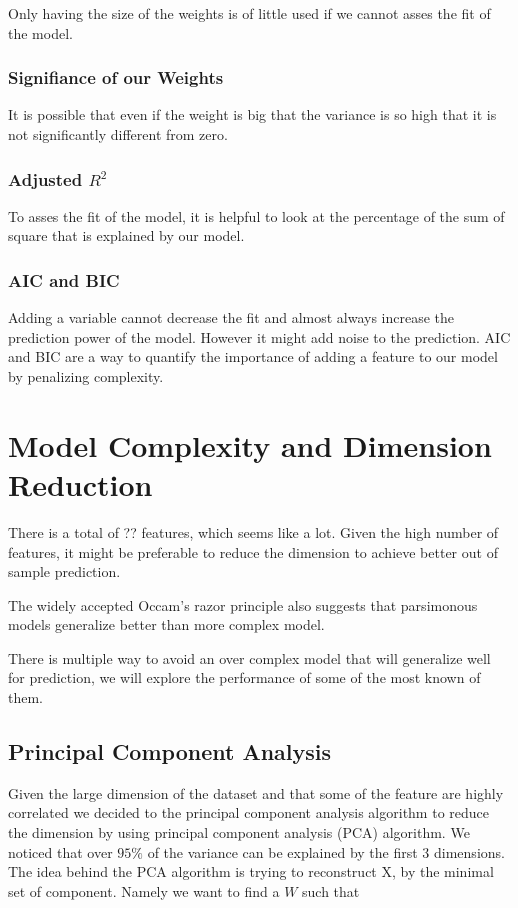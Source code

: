 \documentclass[conference]{IEEEtran}\usepackage[]{graphicx}\usepackage[]{color}
\begin{document}
Only having the size of the weights is of little used if we cannot asses the fit
of the model.

\subsubsection{Signifiance of our Weights}

It is possible that even if the weight is big that the variance is so high that
it is not significantly different from zero.

\subsubsection{Adjusted $R^2$}

To asses the fit of the model, it is helpful to look at the percentage of the
sum of square that is explained by our model.

\subsubsection{AIC and BIC}

Adding a variable cannot decrease the fit and almost always increase the
prediction power of the model. However it might add noise to the prediction. AIC
and BIC are a way to quantify the importance of adding a feature to our model by
penalizing complexity.


\section{Model Complexity and Dimension Reduction}

There is a total of ?? features, which seems like a lot. Given the high number
of features, it might be preferable to reduce the dimension to achieve better
out of sample prediction. 

The widely accepted Occam's razor principle also suggests that parsimonous
models generalize better than more complex model. 

There is multiple way to avoid an over complex model that will generalize well
for prediction, we will explore the performance of some of the most known of
them. 


\subsection{Principal Component Analysis}

Given the large dimension of the dataset and that some of the feature are highly
correlated we decided to the principal component analysis algorithm to reduce
the dimension by using  
principal component analysis (PCA) algorithm. We noticed that over $95\%$ of the
variance can be explained by the first $3$ dimensions. The idea behind the PCA
algorithm is trying to reconstruct X, by the minimal set of component. Namely we
want to find a $W$ such that 
\end{document}
